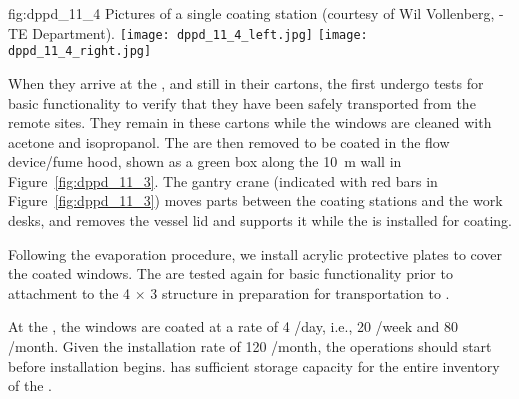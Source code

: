 \begin{dunefigure}{fig:dppd_11_4}
{Pictures of a single  coating station (courtesy of Wil Vollenberg, -TE Department).}
\texttt{[image: dppd\_11\_4\_left.jpg]}
\texttt{[image: dppd\_11\_4\_right.jpg]}
\end{dunefigure}

When they arrive at the , and still in their cartons, the  first undergo tests for basic functionality to verify that they have been safely transported from the remote sites. They remain in these cartons while the windows are cleaned with acetone and isopropanol. The  are then removed to be coated in the flow device/fume hood, shown as a green box along the \SI{10}{\m} wall in Figure~\ref{fig:dppd_11_3}. The gantry crane (indicated with red bars in Figure~\ref{fig:dppd_11_3}) moves parts between the coating stations and the work desks, %
and removes the vessel lid and supports it while the  is installed for coating.

Following the evaporation procedure, we install acrylic protective plates to cover the coated  windows.
The  are tested again for basic functionality prior to attachment %
to the \num{4} $\times$ \num{3} structure in preparation for transportation to .

At the , the  windows are coated at a rate of \num{4} /day, i.e., \num{20} /week and \num{80} /month. Given the installation rate of \num{120} /month, the  operations should start before installation begins.  has sufficient storage capacity for the entire  inventory of the . 

